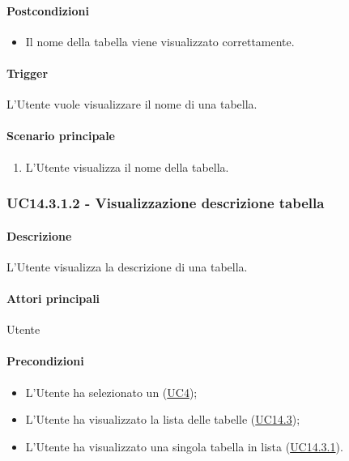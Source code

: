 \paragraph*{Postcondizioni}
\begin{itemize}
  \item Il nome della tabella viene visualizzato correttamente.
\end{itemize}

\paragraph*{Trigger}
L'Utente vuole visualizzare il nome di una tabella.

\paragraph*{Scenario principale}
\begin{enumerate}
  \item L'Utente visualizza il nome della tabella.
\end{enumerate}


\subsubsection{UC14.3.1.2 - Visualizzazione descrizione tabella}\label{UC14point3point1point2}
\paragraph*{Descrizione}
L'Utente visualizza la descrizione di una tabella.

\paragraph*{Attori principali}
Utente

\paragraph*{Precondizioni}
\begin{itemize}
  \item L'Utente ha selezionato un  (\hyperref[UC4]{UC4});
  \item L'Utente ha visualizzato la lista delle tabelle (\hyperref[UC14point3]{UC14.3});
  \item L'Utente ha visualizzato una singola tabella in lista (\hyperref[UC14point3point1]{UC14.3.1}).
\end{itemize}

